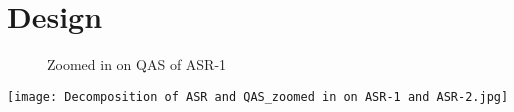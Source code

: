 \chapter{Design}\label{s:design}

\graphicspath{ {./images/} }
\begin{figure}[t]
\centering
\caption{Zoomed in on QAS of ASR-1}
\label{fig:ASR2}
\end{figure}
\texttt{[image: Decomposition of ASR and QAS\_zoomed in on ASR-1 and ASR-2.jpg]}\\


